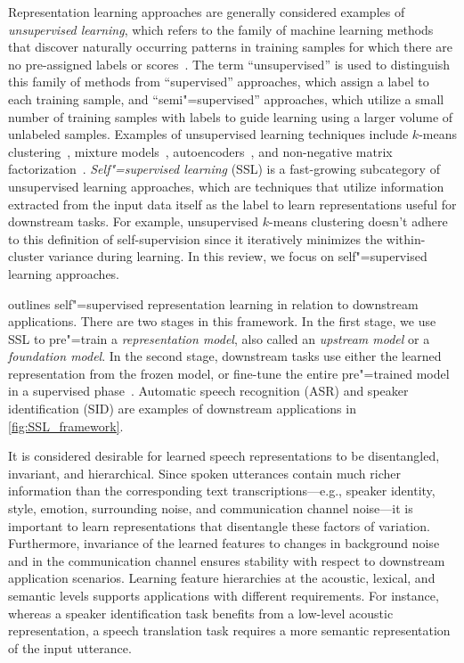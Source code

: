 Representation learning approaches are generally considered examples of \textit{unsupervised
learning}, which refers to the family of machine learning methods that discover
naturally occurring patterns in training samples for which there are no pre-assigned
labels or scores~\parencite{jordan_machine_2015}. 
The term ``unsupervised'' is used to distinguish this family of methods from
``supervised'' approaches, which assign a label to each training sample, and
``semi"=supervised'' approaches, which utilize a small number of training samples
with labels to guide learning using a larger volume of unlabeled samples.
Examples of unsupervised learning techniques include $k$-means clustering~\parencite{gray_vector_1984}, mixture models~\parencite{jordan_hierarchical_1994}, autoencoders~\parencite{hinton_autoencoders_1994},
and non-negative matrix factorization~\parencite{lee_learning_1999}. 
\textit{Self"=supervised learning} (SSL) is a fast-growing subcategory of
unsupervised learning approaches, which are techniques that utilize
information extracted from the input data itself as the label to learn
representations useful for 
downstream tasks. {\color{black} For example, unsupervised $k$-means clustering doesn't adhere to this definition of self-supervision since it iteratively minimizes the within-cluster variance during learning.}
In this review, we
focus on self"=supervised learning approaches.

 outlines self"=supervised representation learning in
relation to downstream applications. 
There are two stages in this framework.
In the first stage, we use SSL to pre"=train a \textit{representation model},
also called an \textit{upstream model} or a \textit{foundation model}.
In the second stage, downstream tasks use either the learned
representation from the frozen model, or fine-tune the entire pre"=trained model
in a supervised phase~\parencite{hinton_reducing_2006}. 
Automatic speech recognition (ASR) and speaker identification (SID) are 
examples of downstream applications in \cref{fig:SSL_framework}.

It is considered desirable for learned speech representations to be
disentangled, invariant, and hierarchical.
Since spoken utterances contain much richer information than the corresponding text
transcriptions---e.g., speaker identity, style, emotion, surrounding noise, and
communication channel noise---it is important to learn representations that
disentangle these factors of variation. Furthermore, invariance of the learned
features to changes in background noise and in the communication channel ensures
stability with respect to downstream application scenarios. Learning feature
hierarchies at the acoustic, lexical, and semantic levels supports applications
with different requirements. For instance, whereas a speaker identification task
benefits from a low-level acoustic representation, a speech
translation task requires a more semantic representation of the input
utterance. 

